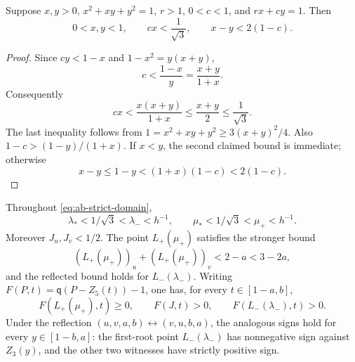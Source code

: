 \begin{lemma}
\label{lem:F-normal-pair-bounds}
Suppose $x,y>0$, $x^2+xy+y^2=1$, $r>1$, $0<c<1$, and
$rx+cy=1$. Then
\[
 0<x,y<1,\qquad cx<\frac1{\sqrt3},\qquad x-y<2(1-c).
\]
\end{lemma}
\begin{proof}
Since $cy<1-x$ and $1-x^2=y(x+y)$,
\[
 c<\frac{1-x}{y}=\frac{x+y}{1+x}.
\]
Consequently
\[
 cx<\frac{x(x+y)}{1+x}\le\frac{x+y}{2}\le\frac1{\sqrt3}.
\]
The last inequality follows from
$1=x^2+xy+y^2\ge3(x+y)^2/4$.
Also $1-c>(1-y)/(1+x)$. If $x<y$, the second claimed
bound is immediate; otherwise
\[
 x-y\le1-y<(1+x)(1-c)<2(1-c).
\]
\end{proof}

\begin{lemma}
\label{lem:fixed-line-signs}
Throughout \eqref{eq:ab-strict-domain},
\begin{equation}
 \lambda_*<1/\sqrt3<\lambda_-<h^{-1},\qquad
 \mu_*<1/\sqrt3<\mu_+<h^{-1}.
 \label{eq:first-root-order}
\end{equation}
Moreover $J_u,J_v<1/2$. The point $L_+(\mu_+)$ satisfies the stronger bound
\[
 (L_+(\mu_+))_u+(L_+(\mu_+))_v<2-a<3-2a,
\]
and the reflected bound holds for $L_-(\lambda_-)$. Writing
$F(P,t)=\mathsf q(P-Z_5(t))-1$, one has, for every $t\in[1-a,b]$,
\begin{equation}
 F(L_+(\mu_+),t)\ge0,\qquad F(J,t)>0,\qquad
 F(L_-(\lambda_-),t)>0.
 \label{eq:moving-right-signs}
\end{equation}
Under the reflection $(u,v,a,b)\leftrightarrow(v,u,b,a)$,
the analogous signs hold for every $y\in[1-b,a]$: the first-root point
$L_-(\lambda_-)$ has nonnegative sign against $Z_3(y)$, and the other
two witnesses have strictly positive sign.
\end{lemma}

